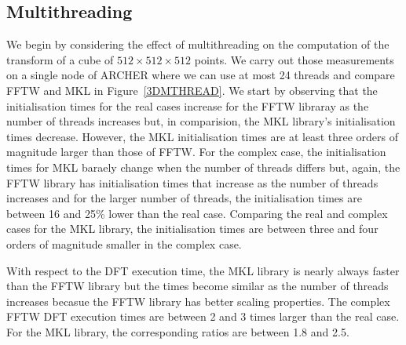 \documentclass[12pt, a4paper]{article} \setlength{\textheight}{24cm}
\begin{document}
\subsection{Multithreading}\label{MULTITHREADING}
We begin by considering the effect of multithreading on the
computation of the transform of a cube of $512 \times 512 \times 512$
points. We carry out those measurements on a single node of ARCHER
where we can use at most 24 threads and compare FFTW and MKL in
Figure~\ref{3DMTHREAD}. We start by observing that the initialisation
times for the real cases increase for the FFTW libraray as the number
of threads increases but, in comparision, the MKL library's
initialisation times decrease. However, the MKL initialisation times
are at least three orders of magnitude larger than those of FFTW. For
the complex case, the initialisation times for MKL baraely change when
the number of threads differs but, again, the FFTW library has
initialisation times that increase as the number of threads increases
and for the larger number of threads, the initialisation times are
between 16 and 25\% lower than the real case. Comparing the real and
complex cases for the MKL library, the initialisation times are
between three and four orders of magnitude smaller in the complex
case.

With respect to the DFT execution time, the MKL library is nearly
always faster than the FFTW library but the times become similar as
the number of threads increases becasue the FFTW library has better
scaling properties. The complex FFTW DFT execution times are between 2
and 3 times larger than the real case. For the MKL library, the 
corresponding ratios are between 1.8 and 2.5.
\end{document}
